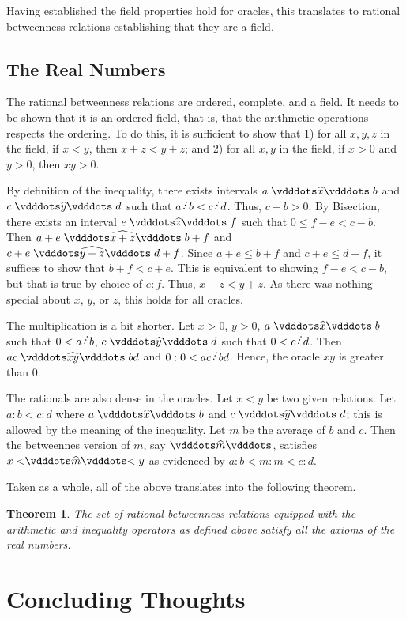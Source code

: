 \documentclass[12pt]{article}
\newtheorem{theorem}{Theorem}[section]
\begin{document}
Having established the field properties hold for oracles, this translates to rational betweenness relations establishing that they are a field. 


\subsection{The Real Numbers}

The rational betweenness relations are ordered, complete, and a field. It needs to be shown that it is an ordered field, that is, that the arithmetic operations respects the ordering. To do this, it is sufficient to show that 1) for all $x, y, z$ in the field, if $x<y$, then $x + z < y +z$; and 2) for all $x, y$ in the field, if $x >0$ and $y>0$, then $xy > 0 $.

By definition of the inequality, there exists intervals $ a \xora[x] b$ and $c \xora[y] d$ such that $a \lte b < c \lte d$. Thus, $c-b > 0$. By Bisection, there exists an interval $e \xora[z] f$ such that $0 \leq f-e < c-b$. Then $a+e \xora[x+z] b+f$ and $c+e \xora[y+z] d+f$. Since $a+e \leq  b+f$ and $c+e \leq d+f$, it suffices to show that $b+f < c+e$. This is equivalent to showing $f-e < c-b$, but that is true by choice of $e:f$. Thus, $x+z < y+z$. As there was nothing special about $x$, $y$, or $z$, this holds for all oracles. 

The multiplication is a bit shorter. Let $x >0 $, $y >0$, $a \xora b$ such that $0<a \lte b$, $c \xora[y] d$ such that $0 < c \lte d$. Then $ac \xora[xy] bd$ and $0:0 < ac \lte bd$. Hence, the oracle $xy$ is greater than 0. 

The rationals are also dense in the oracles. Let $x < y$ be two given relations. Let $a:b < c:d$ where $a \xora b$ and $c \xora[y] d$; this is allowed by the meaning of the inequality. Let $m$ be the average of $b$ and $c$. Then the betweennes version of $m$, say $\xora[m]$, satisfies $x < \xora[m] < y$ as evidenced by $a:b < m:m < c:d$.

Taken as a whole, all of the above translates into the following theorem.

\begin{theorem}
    The set of rational betweenness relations equipped with the arithmetic and inequality operators as defined above satisfy all the axioms of the real numbers. 
\end{theorem}


\section{Concluding Thoughts}
\end{document}
